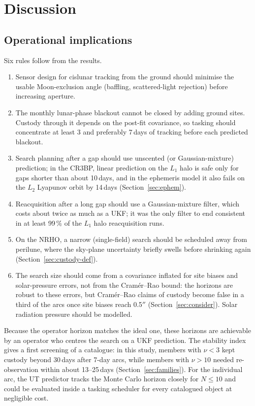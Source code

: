 \documentclass[pdflatex,sn-mathphys-num]{sn-jnl}
\begin{document}
\section{Discussion}\label{sec:discussion}

\subsection{Operational implications}
Six rules follow from the results.
\begin{enumerate}
\item Sensor design for cislunar tracking from the ground should minimise the usable
      Moon-exclusion angle (baffling, scattered-light rejection) before increasing aperture.
\item The monthly lunar-phase blackout cannot be closed by adding ground sites. Custody through it
      depends on the post-fit covariance, so tasking should concentrate at least 3 and preferably
      7\,days of tracking before each predicted blackout.
\item Search planning after a gap should use unscented (or Gaussian-mixture) prediction; in the CR3BP,
      linear prediction on the $L_1$ halo is safe only for gaps shorter than about 10\,days, and in
      the ephemeris model it also fails on the $L_2$ Lyapunov orbit by 14\,days (Section~\ref{sec:ephem}).
\item Reacquisition after a long gap should use a Gaussian-mixture filter, which costs about twice
      as much as a UKF; it was the only filter to end consistent in at least 99\,\% of the $L_1$ halo reacquisition runs.
\item On the NRHO, a narrow (single-field) search should be scheduled away from perilune, where the
      sky-plane uncertainty briefly swells before shrinking again (Section~\ref{sec:custody-def}).
\item The search size should come from a covariance inflated for site biases and solar-pressure
      errors, not from the Cram\'er--Rao bound: the horizons are robust to these errors, but
      Cram\'er--Rao claims of custody become false in a third of the arcs once site biases reach
      0.5$''$ (Section~\ref{sec:consider}). Solar radiation pressure should be modelled.
\end{enumerate}
Because the operator horizon matches the ideal one, these horizons are achievable by an operator who
centres the search on a UKF prediction. The stability index gives a first screening of a catalogue: in
this study, members with $\nu < 3$ kept custody beyond 30\,days after 7-day arcs, while members with
$\nu > 10$ needed re-observation within about 13--25\,days (Section~\ref{sec:families}). For the
individual arc, the UT predictor tracks the Monte Carlo horizon closely for $N \le 10$ and could be
evaluated inside a tasking scheduler for every catalogued object at negligible cost.
\end{document}
